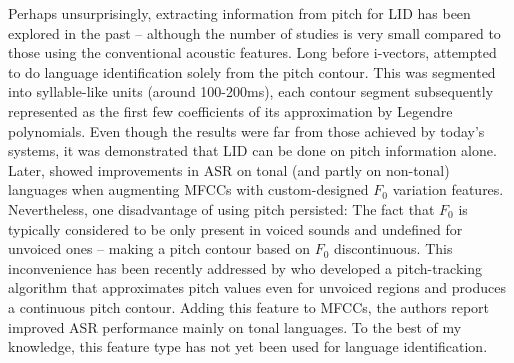 \documentclass[bsc,frontabs,twoside,singlespacing,parskip,deptreport]{infthesis}
\begin{document}
{{{      %
      Perhaps unsurprisingly, extracting information from pitch for LID has been explored in the past -- although the number of studies is very small compared to those using the conventional acoustic features. Long before i-vectors, \citet{Lin_et_al_2005} attempted to do language identification solely from the pitch contour. This was segmented into syllable-like units (around 100-200ms), each contour segment subsequently represented as the first few coefficients of its approximation by Legendre polynomials. Even though the results were far from those achieved by today's systems, it was demonstrated that LID can be done on pitch information alone. Later, \citet{Metze_et_al_2013} showed improvements in ASR on tonal (and partly on non-tonal) languages when augmenting MFCCs with custom-designed $F_0$ variation features. Nevertheless, one disadvantage of using pitch persisted: The fact that $F_0$ is typically considered to be only present in voiced sounds and undefined for unvoiced ones -- making a pitch contour based on $F_0$ discontinuous. This inconvenience has been recently addressed by \cite{Ghahremani_et_al_2014} who developed a pitch-tracking algorithm that approximates pitch values even for unvoiced regions and produces a continuous pitch contour. Adding this feature to MFCCs, the authors report improved ASR performance mainly on tonal languages. To the best of my knowledge, this feature type has not yet been used for language identification.


}}}
\end{document}
